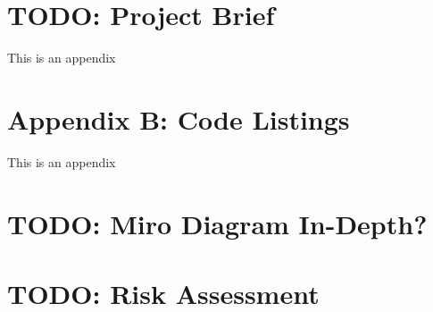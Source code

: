 \chapter{TODO: Project Brief} \label{appendix1}
This is an appendix

\chapter{Appendix B: Code Listings} \label{appendix2}
This is an appendix

\chapter{TODO: Miro Diagram In-Depth?}

\chapter{TODO: Risk Assessment}%